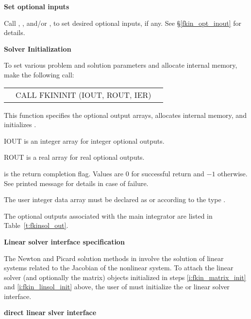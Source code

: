 \begin{Steps}
\item\label{i:fkinsol_opt_input}{\bf Set optional inputs} 

  Call , , and/or , to set desired 
  optional inputs, if any.  See \S\ref{fkin_opt_inout} for details.

\item {\bf Solver Initialization}

  To set various problem and solution parameters and allocate
  internal memory, make the following call:
  {
    \begin{tabular}[t]{@{}r@{}l@{}l@{}}
        &CALL FKININIT (IOUT, ROUT, IER)
    \end{tabular}
  }
  {
    This function specifies the optional output arrays,
    allocates internal memory, and initializes {\kinsol}.
  }
  {
    \begin{args}[IOUT\,]
    \item[IOUT] is an integer array for integer optional outputs.
    \item[ROUT] is a real array for real optional outputs.
    \end{args}
  }
  {
     is the return completion flag. Values are $0$ for successful return
    and $-1$ otherwise. See printed message for details in case of failure.
  }
  {
    The user integer data array  must be declared as  or
     according to the {\CC} type .

    The optional outputs associated with the main {\kinsol} integrator
    are listed in Table~\ref{t:fkinsol_out}.
  }

\item\label{i:fkinsol_lin_solv_spec}{\bf Linear solver interface specification} 

  The Newton and Picard solution methods in {\kinsol} involve the solution of linear systems 
  related to the Jacobian of the nonlinear system. 
  To attach the linear solver (and optionally the matrix) objects
  initialized in steps \ref{i:fkin_matrix_init} and
  \ref{i:fkin_linsol_init} above, the user of {\fkinsol} must initialize
  the {\kindls} or {\kinspils} linear solver interface.


  {\bf {\kindls} direct linear slver interface}
  

\end{Steps}
